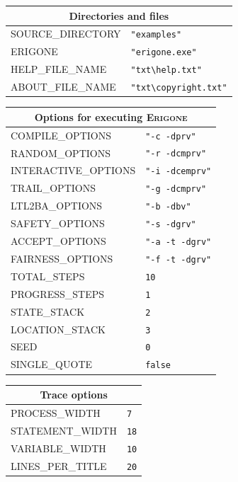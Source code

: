\documentclass[11pt]{article}
\newcommand{\eri}{\textsc{Erigone}}
\begin{document}
\begin{center}

\begin{tabular}{|p{}|p{}|}
\hline
\multicolumn{2}{|c|}{Directories and files}\\ \hline
\textsc{\ttfamily SOURCE\_DIRECTORY} & \verb+"examples"+ \\
\textsc{\ttfamily ERIGONE} &\verb+"erigone.exe"+ \\
\textsc{\ttfamily HELP\_FILE\_NAME} &\verb+"txt\help.txt"+\\
\textsc{\ttfamily ABOUT\_FILE\_NAME} &\verb+"txt\copyright.txt"+\\
\hline
\end{tabular}

\bigskip

\begin{tabular}{|p{}|p{}|}
\hline
\multicolumn{2}{|c|}{Options for executing \eri{}}\\ \hline
\textsc{\ttfamily COMPILE\_OPTIONS} &\verb+"-c -dprv"+\\
\textsc{\ttfamily RANDOM\_OPTIONS} &\verb+"-r -dcmprv"+\\
\textsc{\ttfamily INTERACTIVE\_OPTIONS} &\verb+"-i -dcemprv"+\\
\textsc{\ttfamily TRAIL\_OPTIONS} &\verb+"-g -dcmprv"+\\
\textsc{\ttfamily LTL2BA\_OPTIONS} &\verb+"-b -dbv"+\\
\textsc{\ttfamily SAFETY\_OPTIONS} &\verb+"-s -dgrv"+\\
\textsc{\ttfamily ACCEPT\_OPTIONS} &\verb+"-a -t -dgrv"+\\
\textsc{\ttfamily FAIRNESS\_OPTIONS} &\verb+"-f -t -dgrv"+\\

\textsc{\ttfamily TOTAL\_STEPS} & \verb+10+\\
\textsc{\ttfamily PROGRESS\_STEPS} & \verb+1+\\
\textsc{\ttfamily STATE\_STACK} & \verb+2+\\
\textsc{\ttfamily LOCATION\_STACK} & \verb+3+\\
\textsc{\ttfamily SEED} & \verb+0+\\
\textsc{\ttfamily SINGLE\_QUOTE} & \verb+false+\\\hline
\end{tabular}

\bigskip

\begin{tabular}{|p{}|p{}|}
\hline
\multicolumn{2}{|c|}{Trace options}\\ \hline
\textsc{\ttfamily PROCESS\_WIDTH} & \verb+7+\\
\textsc{\ttfamily STATEMENT\_WIDTH} & \verb+18+\\
\textsc{\ttfamily VARIABLE\_WIDTH} &\verb+10+\\
\textsc{\ttfamily LINES\_PER\_TITLE} &\verb+20+\\
\hline
\end{tabular}


\end{center}
\end{document}
